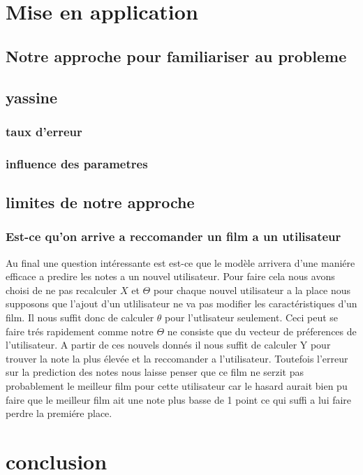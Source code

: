 \documentclass[a4paper,10pt]{article}
\begin{document}
\section{Mise en application}
\subsection{Notre approche pour familiariser au probleme}
\subsection{yassine}
\subsubsection{taux d'erreur}
\subsubsection{influence des parametres}
\subsection{limites de notre approche}
\subsubsection{Est-ce qu'on arrive a reccomander un film a un utilisateur}
Au final une question intéressante est est-ce que le modèle arrivera d'une maniére efficace a predire les notes a un nouvel utilisateur. Pour faire cela nous avons
choisi de ne pas recalculer $X$ et $\Theta$ pour chaque nouvel utilisateur a la place nous supposons que l'ajout d'un utlilisateur ne va pas modifier
les caractéristiques d'un film. Il nous suffit donc de calculer $\theta$ pour l'utlisateur seulement. Ceci peut se faire trés rapidement comme notre $\Theta$ ne
consiste que du vecteur de préferences de l'utilisateur. A partir de ces nouvels donnés il nous suffit de calculer Y pour trouver la note la plus élevée et la reccomander
a l'utilisateur. Toutefois l'erreur sur la prediction des notes nous laisse penser que ce film ne serzit pas probablement le meilleur film
pour cette utilisateur car le hasard aurait bien pu faire que le meilleur film ait une note plus basse de 1 point ce qui suffi a lui faire perdre la premiére place.
\section{conclusion}
\end{document}
